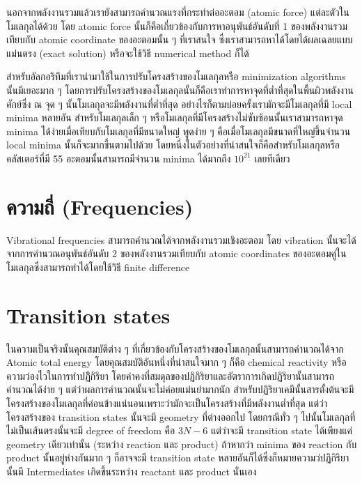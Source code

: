 นอกจากพลังงานรวมแล้วเรายังสามารถคำนวณแรงที่กระทำต่ออะตอม (atomic force) แต่ละตัวในโมเลกุลได้ด้วย 
โดย atomic force นั้นก็คือเกี่ยวข้องกับการหาอนุพันธ์อันดับที่ 1 ของพลังงานรวมเทียบกับ atomic coordinate 
ของอะตอมนั้น ๆ ที่เราสนใจ ซึ่งเราสามารถหาได้โดยได้ผลเฉลยแบบแม่นตรง (exact solution) หรือจะใช้วิธี 
numerical method ก็ได้

สำหรับอัลกอริทึมที่เรานำมาใช้ในการปรับโครงสร้างของโมเลกุลหรือ minimization algorithms นั้นมีเยอะมาก ๆ 
โดยการปรับโครงสร้างของโมเลกุลนั้นก็คือเราทำการหาจุดที่ต่ำที่สุดในพื้นผิวพลังงานศักย์ซึ่ง 
ณ จุด ๆ นั้นโมเลกุลจะมีพลังงานที่ต่ำที่สุด อย่างไรก็ตามบ่อยครั้งเรามักจะมีโมเลกุลที่มี local minima หลายอัน 
สำหรับโมเลกุลเล็ก ๆ หรือโมเลกุลที่มีโครงสร้างไม่ซับซ้อนนั้นเราสามารถหาจุด minima 
ได้ง่ายเมื่อเทียบกับโมเลกุลที่มีขนาดใหญ่ พูดง่าย ๆ คือเมื่อโมเลกุลมีขนาดที่ใหญ่ขึ้นจำนวน local minima 
นั้นก็จะมากขึ้นตามไปด้วย โดยหนึ่งในตัวอย่างที่น่าสนใจก็คือสำหรับโมเลกุลหรือคลัสเตอร์ที่มี 55 อะตอมนั้นสามารถมีจำนวน 
minima ได้มากถึง $10^{21}$ เลยทีเดียว

\section{ความถี่ (Frequencies)}

Vibrational frequencies สามารถคำนวณได้จากพลังงานรวมเชิงอะตอม โดย vibration 
นั้นจะได้จากการคำนวณอนุพันธ์อันดับ 2 ของพลังงานรวมเทียบกับ atomic coordinates 
ของอะตอมคู่ในโมเลกุลซึ่งสามารถทำได้โดยใช้วิธี finite difference 

\section{Transition states}

ในความเป็นจริงนั้นคุณสมบัติต่าง ๆ ที่เกี่ยวข้องกับโครงสร้างของโมเลกุลนั้นสามารถคำนวณได้จาก Atomic total energy 
โดยคุณสมบัติอันหนึ่งที่น่าสนใจมาก ๆ ก็คือ chemical reactivity หรือความว่องไวในการทำปฏิิกิริยา 
โดยค่าคงที่สมดุลของปฏิกิริยาและอัตราการเกิดปฏิริยานั้นสามารถคำนวณได้ง่าย ๆ แต่ว่าผลการคำนวณนั้นจะไม่ค่อยแม่นยำมากนัก 
สำหรับปฏิริยาเคมีนั้นสารตั้งต้นจะมีโครงสร้างของโมเลกุลที่ค่อนข้างแน่นอนเพราะว่ามักจะเป็นโครงสร้างที่มีพลังงานต่ำที่สุด 
แต่ว่าโครงสร้างของ transition states นั้นจะมี geometry ที่ต่างออกไป โดยกรณีทั่ว ๆ ไปนั้นโมเลกุลที่ไม่เป็นเส้นตรงนั้นจะมี 
degree of freedom คือ $3N - 6$ แต่ว่าจะมี transition state ได้เพียงแค่ geometry เดียวเท่านั้น 
(ระหว่าง reaction และ product) ถ้าหากว่า minima ของ reaction กับ product นั้นอยู่ห่างกันมาก ๆ 
ก็อาจจะมี transition state หลายอันก็ได้ซึ่งก็หมายความว่ปฏิกิริยานั้นมี Intermediates เกิดขึ้นระหว่าง 
reactant และ product นั่นเอง 

